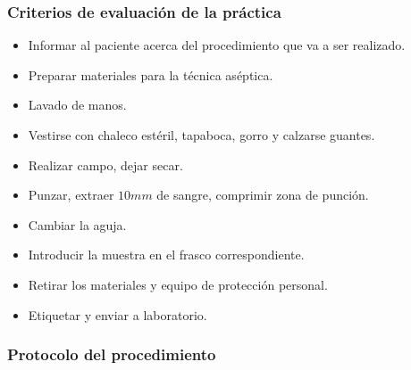 \subsubsection{Criterios de evaluación de la práctica}
\begin{itemize}
\item Informar al paciente acerca del procedimiento que va a ser realizado.
\item Preparar materiales para la técnica aséptica.
\item Lavado de manos.
\item Vestirse con chaleco estéril, tapaboca, gorro y calzarse guantes.
\item Realizar campo, dejar secar.
\item Punzar, extraer $10mm$ de sangre, comprimir zona de punción.
\item Cambiar la aguja.
\item Introducir la muestra en el frasco correspondiente.
\item Retirar los materiales y equipo de protección personal.
\item Etiquetar y enviar a laboratorio.
\end{itemize}

\subsubsection{Protocolo del procedimiento}
\label{sec:hemocultivo_protocolo}

